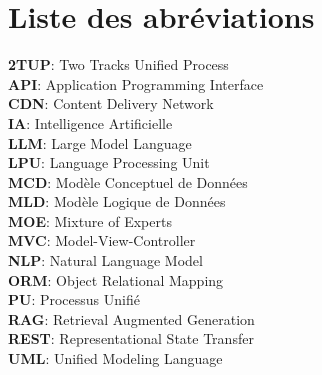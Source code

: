 \thispagestyle{empty}

\chapter*{Liste des abréviations}

\noindent
\vspace{0.5em}
\textbf{2TUP}: Two Tracks Unified Process\\
\vspace{0.5em}
\textbf{API}: Application Programming Interface \\
\vspace{0.5em}
\textbf{CDN}: Content Delivery Network \\
\vspace{0.5em}
\textbf{IA}: Intelligence Artificielle\\ 
\vspace{0.5em}
\textbf{LLM}: Large Model Language \\
\vspace{0.5em}
\textbf{LPU}: Language Processing Unit \\
\vspace{0.5em}
\textbf{MCD}: Modèle Conceptuel de Données \\ 
\vspace{0.5em}
\textbf{MLD}: Modèle Logique de Données \\
\vspace{0.5em}
\textbf{MOE}: Mixture of Experts \\
\vspace{0.5em}
\textbf{MVC}: Model-View-Controller \\
\vspace{0.5em}
\textbf{NLP}: Natural Language Model \\
\vspace{0.5em}
\textbf{ORM}: Object Relational Mapping \\
\vspace{0.5em}
\textbf{PU}: Processus Unifié \\
\vspace{0.5em}
\textbf{RAG}: Retrieval Augmented Generation \\
\vspace{0.5em}
\textbf{REST}: Representational State Transfer \\
\vspace{0.5em}
\textbf{UML}: Unified Modeling Language \\
 
